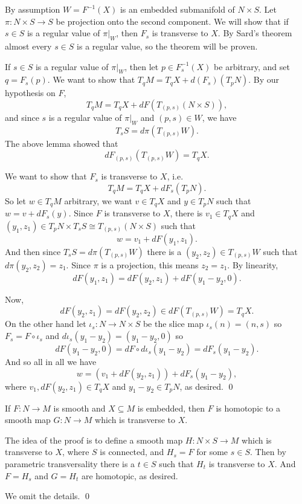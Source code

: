 \ethrm

\bproof

    By assumption $W=F^{-1}(X)$ is an embedded submanifold of $N\times S$.
    Let $\pi\colon N\times S\to S$ be projection onto the second component.
    We will show that if $s\in S$ is a regular value of $\pi|_W$, then $F_s$ is transverse to $X$.
    By Sard's theorem almost every $s\in S$ is a regular value, so the theorem will be proven.

    If $s\in S$ is a regular value of $\pi|_W$, then let $p\in F_s^{-1}(X)$ be arbitrary, and set $q=F_s(p)$.
    We want to show that $T_qM=T_qX+d(F_s)(T_pN)$.
    By our hypothesis on $F$,
    $$ T_qM = T_qX + dF(T_{(p,s)}(N\times S)) , $$
    and since $s$ is a regular value of $\pi|_W$ and $(p,s)\in W$, we have
    $$ T_sS = d\pi(T_{(p,s)}W) . $$
    The above lemma showed that
    $$ dF_{(p,s)}(T_{(p,s)}W) = T_qX . $$

    We want to show that $F_s$ is transverse to $X$, i.e.
    $$ T_qM = T_qX + dF_s(T_pN) . $$
    So let $w\in T_qM$ arbitrary, we want $v\in T_qX$ and $y\in T_pN$ such that $w=v+dF_s(y)$.
    Since $F$ is transverse to $X$, there is $v_1\in T_qX$ and $(y_1,z_1)\in T_pN\times T_sS\cong T_{(p,s)}(N\times S)$ such that
    $$ w = v_1 + dF(y_1,z_1) . $$
    And then since $T_sS=d\pi(T_{(p,s)}W)$ there is a $(y_2,z_2)\in T_{(p,s)}W$ such that $d\pi(y_2,z_2)=z_1$.
    Since $\pi$ is a projection, this means $z_2=z_1$.
    By linearity,
    $$ dF(y_1,z_1) = dF(y_2,z_1) + dF(y_1-y_2,0) . $$

    Now,
    $$ dF(y_2,z_1) = dF(y_2,z_2) \in dF(T_{(p,s)}W) = T_qX . $$
    On the other hand let $\iota_s\colon N\to N\times S$ be the slice map $\iota_s(n)=(n,s)$ so $F_s=F\circ\iota_s$ and
    $d\iota_s(y_1-y_2)=(y_1-y_2,0)$ so
    $$ dF(y_1-y_2,0) = dF\circ d\iota_s(y_1-y_2) = dF_s(y_1-y_2) . $$
    And so all in all we have
    $$ w = (v_1 + dF(y_2,z_1)) + dF_s(y_1-y_2) , $$
    where $v_1,dF(y_2,z_1)\in T_qX$ and $y_1-y_2\in T_pN$, as desired.
    \qed

\eproof

\bthrm[title=Transversality homotopy]

    If $F\colon N\to M$ is smooth and $X\subseteq M$ is embedded, then $F$ is homotopic to a smooth map $G\colon N\to M$
    which is transverse to $X$.

\ethrm

\bproof

    The idea of the proof is to define a smooth map $H\colon N\times S\to M$ which is transverse to $X$, where $S$ is connected, and $H_s=F$ for
    some $s\in S$.
    Then by parametric transversality there is a $t\in S$ such that $H_t$ is transverse to $X$.
    And $F=H_s$ and $G=H_t$ are homotopic, as desired.

    We omit the details.
    \qed

\eproof

